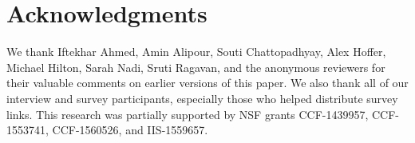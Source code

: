 \section*{Acknowledgments}

We thank Iftekhar Ahmed, Amin Alipour, Souti Chattopadhyay, Alex Hoffer, Michael Hilton, Sarah Nadi, Sruti Ragavan, and the anonymous reviewers for their valuable comments on earlier versions of this paper.
We also thank all of our interview and survey participants, especially those who helped distribute survey links.
This research was partially supported by NSF grants CCF-1439957, CCF-1553741, CCF-1560526, and IIS-1559657.
